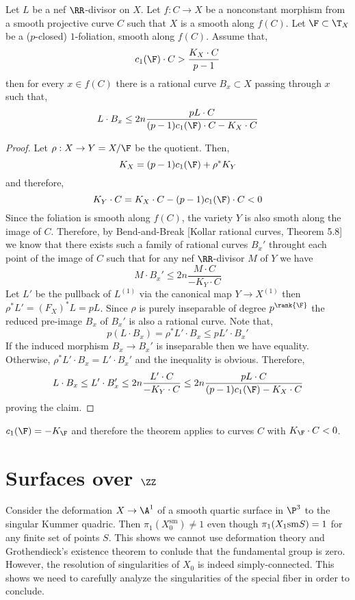 \documentclass[12pt]{article}
\begin{document}
\begin{theorem}[Miyaoka]
Let $L$ be a nef $\RR$-divisor on $X$. Let $f : C \to X$ be a nonconstant morphism from a smooth projective curve $C$ such that $X$ is a smooth along $f(C)$. Let $\F \subset \T_X$ be a ($p$-closed) $1$-foliation, smooth along $f(C)$. Assume that,
\[ c_1(\F) \cdot C > \frac{K_X \cdot C}{p-1} \]
then for every $x \in f(C)$ there is a rational curve $B_x \subset X$ passing through $x$ such that,
\[ L \cdot B_x \le 2n \frac{p L \cdot C}{(p-1) c_1(\F) \cdot C - K_X \cdot C} \]
\end{theorem}

\begin{proof}
Let $\rho : X \to Y = X / \F$ be the quotient. Then,
\[ K_X = (p-1) c_1(\F) + \rho^* K_Y \] 
and therefore,
\[ K_Y \cdot C = K_X \cdot C - (p-1) c_1(\F) \cdot C < 0 \]
Since the foliation is smooth along $f(C)$, the variety $Y$ is also smoth along the image of $C$. Therefore, by Bend-and-Break [Kollar rational curves, Theorem 5.8] we know that there exists such a family of rational curves $B_x'$ throught each point of the image of $C$ such  that for any nef $\RR$-divisor $M$ of $Y$ we have
\[ M \cdot B_x' \le 2n \frac{M \cdot C}{-K_Y \cdot C} \]
Let $L'$ be the pullback of $L^{(1)}$ via the canonical map $Y \to X^{(1)}$ then $\rho^* L' = (F_X)^* L = p L$. Since $\rho$ is purely inseparable of degree $p^{\rank{\F}}$ the reduced pre-image $B_x$ of $B_x'$ is also a rational curve. Note that,
\[ p (L \cdot B_x) = \rho^* L' \cdot B_x \le p L' \cdot B_x' \]
If the induced morphism $B_x \to B_x'$ is inseparable then we have equality. Otherwise, $\rho^* L' \cdot B_x = L' \cdot B_x'$ and the inequality is obvious. Therefore,
\[ L \cdot B_x \le L' \cdot B_x' \le 2n \frac{L' \cdot C}{-K_Y \cdot C} \le 2n \frac{p L \cdot C}{(p-1) c_1(\F) - K_X \cdot C} \]
proving the claim.
\end{proof}

\begin{rmk}
$c_1(\F) = - K_{\F}$ and therefore the theorem applies to curves $C$ with $K_{\F} \cdot C < 0$.
\end{rmk}


\section{Surfaces over $\ZZ$}

\begin{example}
Consider the deformation $X \to \A^1$ of a smooth quartic surface in $\P^3$ to the singular Kummer quadric. Then $\pi_1(X_0^{\text{sm}}) \neq 1$ even though $\pi_1(X_1 \mathrm{sm} S) = 1$ for any finite set of points $S$. This shows we cannot use deformation theory and Grothendieck's existence theorem to conlude that the fundamental group is zero. However, the resolution of singularities of $X_0$ is indeed simply-connected. This shows we need to carefully analyze the singularities of the special fiber in order to conclude.
\end{example}
\end{document}
